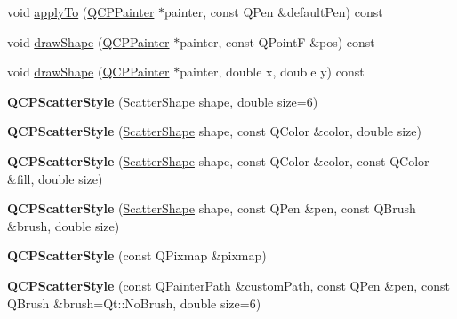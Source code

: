 \begin{DoxyCompactItemize}
void \hyperlink{class_q_c_p_scatter_style_a81817dfd404635f211e6ff2a04657d36}{apply\+To} (\hyperlink{class_q_c_p_painter}{Q\+C\+P\+Painter} $\ast$painter, const Q\+Pen \&default\+Pen) const 
\item 
void \hyperlink{class_q_c_p_scatter_style_aeaf6dbadb0b0e6d890a6e3bbe5aebece}{draw\+Shape} (\hyperlink{class_q_c_p_painter}{Q\+C\+P\+Painter} $\ast$painter, const Q\+PointF \&pos) const 
\item 
void \hyperlink{class_q_c_p_scatter_style_ae76811ac9f70ebf7a2b4c759853e6ed8}{draw\+Shape} (\hyperlink{class_q_c_p_painter}{Q\+C\+P\+Painter} $\ast$painter, double x, double y) const 
\item 
{\bfseries Q\+C\+P\+Scatter\+Style} (\hyperlink{class_q_c_p_scatter_style_adb31525af6b680e6f1b7472e43859349}{Scatter\+Shape} shape, double size=6)\hypertarget{class_q_c_p_scatter_style_a003d92f74f4561eda111862eadd62f28}{}\label{class_q_c_p_scatter_style_a003d92f74f4561eda111862eadd62f28}

\item 
{\bfseries Q\+C\+P\+Scatter\+Style} (\hyperlink{class_q_c_p_scatter_style_adb31525af6b680e6f1b7472e43859349}{Scatter\+Shape} shape, const Q\+Color \&color, double size)\hypertarget{class_q_c_p_scatter_style_afa059da858c864c7e05871dc602d7eab}{}\label{class_q_c_p_scatter_style_afa059da858c864c7e05871dc602d7eab}

\item 
{\bfseries Q\+C\+P\+Scatter\+Style} (\hyperlink{class_q_c_p_scatter_style_adb31525af6b680e6f1b7472e43859349}{Scatter\+Shape} shape, const Q\+Color \&color, const Q\+Color \&fill, double size)\hypertarget{class_q_c_p_scatter_style_a6e1b64f12cac7f07af180ae4316fd38d}{}\label{class_q_c_p_scatter_style_a6e1b64f12cac7f07af180ae4316fd38d}

\item 
{\bfseries Q\+C\+P\+Scatter\+Style} (\hyperlink{class_q_c_p_scatter_style_adb31525af6b680e6f1b7472e43859349}{Scatter\+Shape} shape, const Q\+Pen \&pen, const Q\+Brush \&brush, double size)\hypertarget{class_q_c_p_scatter_style_a85acc4941d7e5c9bca5fa51377a77f49}{}\label{class_q_c_p_scatter_style_a85acc4941d7e5c9bca5fa51377a77f49}

\item 
{\bfseries Q\+C\+P\+Scatter\+Style} (const Q\+Pixmap \&pixmap)\hypertarget{class_q_c_p_scatter_style_a63962094587a4c2258435aa7933996cc}{}\label{class_q_c_p_scatter_style_a63962094587a4c2258435aa7933996cc}

\item 
{\bfseries Q\+C\+P\+Scatter\+Style} (const Q\+Painter\+Path \&custom\+Path, const Q\+Pen \&pen, const Q\+Brush \&brush=Qt\+::\+No\+Brush, double size=6)\hypertarget{class_q_c_p_scatter_style_a879c30647683b3cfbde2afecea815e6f}{}\label{class_q_c_p_scatter_style_a879c30647683b3cfbde2afecea815e6f}


\end{DoxyCompactItemize}
